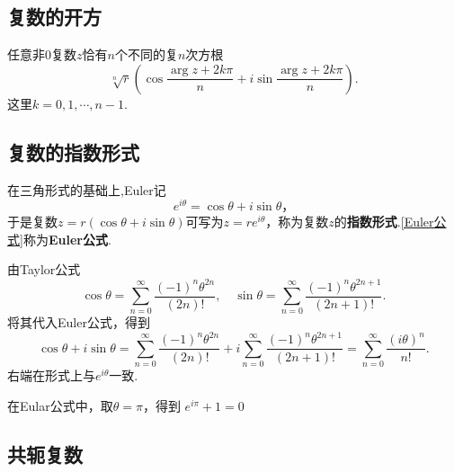 \documentclass[openany,oneside]{ctexbook}
\begin{document}
\subsection{复数的开方}

任意非$0$复数$z$恰有$n$个不同的复$n$次方根
\[
\sqrt[n]{r}\left(\cos\frac{\arg z + 2k\pi}{n} + i\sin\frac{\arg z + 2k\pi}{n}\right).
\]
这里$k = 0, 1, \cdots, n-1$.

\subsection{复数的指数形式}
    在三角形式的基础上,\textrm{Euler}记
    \begin{equation}\label{Euler公式}
        e^{i\theta} = \cos\theta + i\sin\theta，
    \end{equation}
    于是复数$z = r(\cos\theta + i\sin\theta)$可写为$z = re^{i\theta}$，称为复数$z$的\textbf{指数形式}.\eqref{Euler公式}称为\textbf{\textrm{Euler}公式}.

    由\textrm{Taylor}公式
    \[
        \cos\theta = \sum_{n=0}^{\infty} \frac{(-1)^n \theta^{2n}}{(2n)!}, \quad
        \sin\theta = \sum_{n=0}^{\infty} \frac{(-1)^n \theta^{2n+1}}{(2n+1)!}.
    \]
    将其代入\textrm{Euler}公式，得到
    \[
        \cos\theta + i\sin\theta = \sum_{n=0}^{\infty} \frac{(-1)^n \theta^{2n}}{(2n)!} + i\sum_{n=0}^{\infty} \frac{(-1)^n \theta^{2n+1}}{(2n+1)!} 
        = \sum_{n=0}^{\infty} \frac{(i\theta)^n}{n!}.
    \]
    右端在形式上与$e^{i\theta}$一致.
    \par\vspace{8pt}
    \begin{note*}
        在\textrm{Eular}公式中，取$\theta = \pi$，得到
            $e^{i\pi} + 1 = 0$
    \end{note*}    
\subsection{共轭复数}
\end{document}
